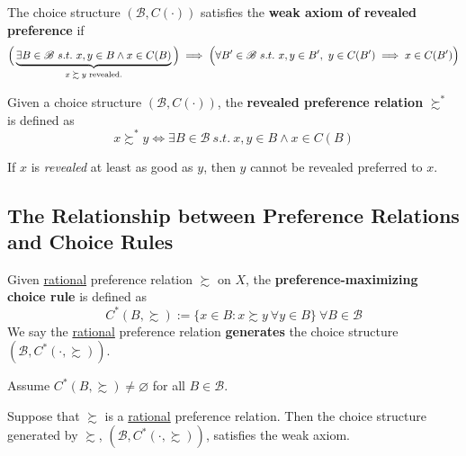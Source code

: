 \documentclass{article}
\begin{document}
		\begin{definition}[1.C.1]
			The choice structure $(\mathscr{B}, C(\cdot))$ satisfies the \textbf{weak axiom of revealed preference} if
			\begin{equation}
				\Big(\underbrace{
					\exists B \in \mathscr{B}\ s.t.\ x, y \in B \land x \in C(B)
					}_{\text{{$x \succsim y$ revealed.}}}
				\Big)
				\implies 
				\Big(
					\forall B' \in \mathscr{B}\ s.t.\ x, y \in B',\ y \in C(B') \implies x \in C(B')
				\Big)
			\end{equation}
		\end{definition}
		
		\begin{definition}
			Given a choice structure $(\mathscr{B}, C(\cdot))$, the \textbf{revealed preference relation} $\succsim^*$ is defined as
			\begin{equation}
				x \succsim^* y \iff \exists B \in \mathscr{B}\ s.t.\ x, y \in B \land x \in C(B)
			\end{equation}
		\end{definition}
		
		\begin{remark}
			If $x$ is \emph{revealed} at least as good as $y$, then $y$ cannot be revealed preferred to $x$.
		\end{remark}
	
	\subsection{The Relationship between Preference Relations and Choice Rules}
		\begin{definition}
			Given \ul{rational} preference relation $\succsim$ on $X$, the \textbf{preference-maximizing choice rule} is defined as 
			\begin{equation}
				C^*(B, \succsim) := \{x \in B: x \succsim y\ \forall y \in B\}\ \forall B \in \mathscr{B}
			\end{equation}
			We say the \ul{rational} preference relation \textbf{generates} the choice structure $(\mathscr{B}, C^*(\cdot, \succsim))$.
		\end{definition}
		
		\begin{assumption}
			Assume $C^*(B, \succsim) \neq \varnothing$ for all $B \in \mathscr{B}$.
		\end{assumption}
		
		\begin{proposition}
			Suppose that $\succsim$ is a \ul{rational} preference relation. Then the choice structure generated by $\succsim$, $(\mathscr{B}, C^*(\cdot, \succsim))$, satisfies the weak axiom.
		\end{proposition}
		
\end{document}
